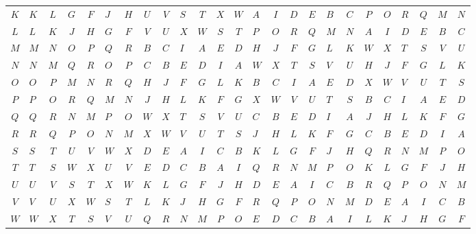 \documentclass[../gatm_answers.tex]{subfiles}
\begin{document}
\begin{figure}[h]
\begin{center}
\begin{minipage}[b]{\textwidth}
\begin{tabular}{c|acccacccacccacccacccaccc}
				$K$ & $K$ & $L$ & $G$ & $F$ & $J$ & $H$ & $U$ & $V$ & $S$ & $T$ & $X$ & $W$ & $A$ & $I$ & $D$ & $E$ & $B$ & $C$ & $P$ & $O$ & $R$ & $Q$ & $M$ & $N$ \\
				$L$ & $L$ & $K$ & $J$ & $H$ & $G$ & $F$ & $V$ & $U$ & $X$ & $W$ & $S$ & $T$ & $P$ & $O$ & $R$ & $Q$ & $M$ & $N$ & $A$ & $I$ & $D$ & $E$ & $B$ & $C$ \\
				$M$ & $M$ & $N$ & $O$ & $P$ & $Q$ & $R$ & $B$ & $C$ & $I$ & $A$ & $E$ & $D$ & $H$ & $J$ & $F$ & $G$ & $L$ & $K$ & $W$ & $X$ & $T$ & $S$ & $V$ & $U$ \\
				$N$ & $N$ & $M$ & $Q$ & $R$ & $O$ & $P$ & $C$ & $B$ & $E$ & $D$ & $I$ & $A$ & $W$ & $X$ & $T$ & $S$ & $V$ & $U$ & $H$ & $J$ & $F$ & $G$ & $L$ & $K$ \\
				$O$ & $O$ & $P$ & $M$ & $N$ & $R$ & $Q$ & $H$ & $J$ & $F$ & $G$ & $L$ & $K$ & $B$ & $C$ & $I$ & $A$ & $E$ & $D$ & $X$ & $W$ & $V$ & $U$ & $T$ & $S$ \\
				$P$ & $P$ & $O$ & $R$ & $Q$ & $M$ & $N$ & $J$ & $H$ & $L$ & $K$ & $F$ & $G$ & $X$ & $W$ & $V$ & $U$ & $T$ & $S$ & $B$ & $C$ & $I$ & $A$ & $E$ & $D$ \\
				$Q$ & $Q$ & $R$ & $N$ & $M$ & $P$ & $O$ & $W$ & $X$ & $T$ & $S$ & $V$ & $U$ & $C$ & $B$ & $E$ & $D$ & $I$ & $A$ & $J$ & $H$ & $L$ & $K$ & $F$ & $G$ \\
				$R$ & $R$ & $Q$ & $P$ & $O$ & $N$ & $M$ & $X$ & $W$ & $V$ & $U$ & $T$ & $S$ & $J$ & $H$ & $L$ & $K$ & $F$ & $G$ & $C$ & $B$ & $E$ & $D$ & $I$ & $A$ \\
				$S$ & $S$ & $T$ & $U$ & $V$ & $W$ & $X$ & $D$ & $E$ & $A$ & $I$ & $C$ & $B$ & $K$ & $L$ & $G$ & $F$ & $J$ & $H$ & $Q$ & $R$ & $N$ & $M$ & $P$ & $O$ \\
				$T$ & $T$ & $S$ & $W$ & $X$ & $U$ & $V$ & $E$ & $D$ & $C$ & $B$ & $A$ & $I$ & $Q$ & $R$ & $N$ & $M$ & $P$ & $O$ & $K$ & $L$ & $G$ & $F$ & $J$ & $H$ \\
				$U$ & $U$ & $V$ & $S$ & $T$ & $X$ & $W$ & $K$ & $L$ & $G$ & $F$ & $J$ & $H$ & $D$ & $E$ & $A$ & $I$ & $C$ & $B$ & $R$ & $Q$ & $P$ & $O$ & $N$ & $M$ \\
				$V$ & $V$ & $U$ & $X$ & $W$ & $S$ & $T$ & $L$ & $K$ & $J$ & $H$ & $G$ & $F$ & $R$ & $Q$ & $P$ & $O$ & $N$ & $M$ & $D$ & $E$ & $A$ & $I$ & $C$ & $B$ \\
				$W$ & $W$ & $X$ & $T$ & $S$ & $V$ & $U$ & $Q$ & $R$ & $N$ & $M$ & $P$ & $O$ & $E$ & $D$ & $C$ & $B$ & $A$ & $I$ & $L$ & $K$ & $J$ & $H$ & $G$ & $F$ \\

\end{tabular}
\end{minipage}
\end{center}
\end{figure}
\end{document}
